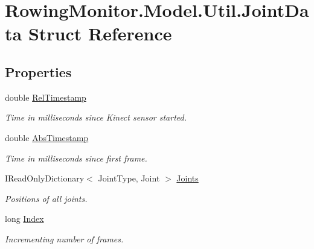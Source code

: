 \hypertarget{struct_rowing_monitor_1_1_model_1_1_util_1_1_joint_data}{}\section{Rowing\+Monitor.\+Model.\+Util.\+Joint\+Data Struct Reference}
\label{struct_rowing_monitor_1_1_model_1_1_util_1_1_joint_data}
\subsection*{Properties}
\begin{DoxyCompactItemize}
\item 
double \hyperlink{struct_rowing_monitor_1_1_model_1_1_util_1_1_joint_data_a56463d7bd16c6e5cad4e3619e9df9508}{Rel\+Timestamp}
\begin{DoxyCompactList}\small\item\em Time in milliseconds since Kinect sensor started. \end{DoxyCompactList}\item 
double \hyperlink{struct_rowing_monitor_1_1_model_1_1_util_1_1_joint_data_a2c951ee40b3e49be73b92cf39c5aa9ab}{Abs\+Timestamp}
\begin{DoxyCompactList}\small\item\em Time in milliseconds since first frame. \end{DoxyCompactList}\item 
I\+Read\+Only\+Dictionary$<$ Joint\+Type, Joint $>$ \hyperlink{struct_rowing_monitor_1_1_model_1_1_util_1_1_joint_data_afa67f920730db9679102686913774e69}{Joints}
\begin{DoxyCompactList}\small\item\em Positions of all joints. \end{DoxyCompactList}\item 
long \hyperlink{struct_rowing_monitor_1_1_model_1_1_util_1_1_joint_data_a2193c6359b3e9e2d6dfdb6178351a8b3}{Index}
\begin{DoxyCompactList}\small\item\em Incrementing number of frames. \end{DoxyCompactList}\item 

\end{DoxyCompactItemize}
